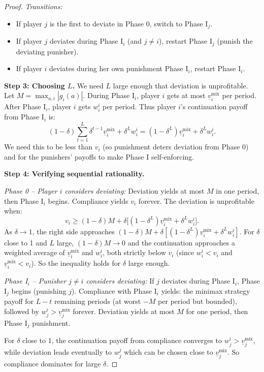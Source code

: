\documentclass[11pt,a4paper]{article}
\theoremstyle{definition}
\theoremstyle{plain}
\theoremstyle{remark}
\begin{document}
\begin{proof}
\emph{Transitions:}
\begin{itemize}
    \item If player $j$ is the first to deviate in Phase 0, switch to Phase I$_j$.
    \item If player $j$ deviates during Phase I$_i$ (and $j \neq i$), restart Phase I$_j$
    (punish the deviating punisher).
    \item If player $i$ deviates during her own punishment Phase I$_i$, restart Phase I$_i$.
\end{itemize}

\textbf{Step 3: Choosing $L$.}
We need $L$ large enough that deviation is unprofitable. Let $M = \max_{a,i} |g_i(a)|$.
During Phase I$_i$, player $i$ gets at most $\underline{v}_i^{\text{mix}}$ per period.
After Phase I$_i$, player $i$ gets $w^i_i$ per period. Thus player $i$'s continuation payoff
from Phase I$_i$ is:
\[
    (1-\delta) \sum_{t=1}^{L} \delta^{t-1} \underline{v}_i^{\text{mix}}
    + \delta^L w^i_i
    = (1 - \delta^L) \underline{v}_i^{\text{mix}} + \delta^L w^i_i.
\]
We need this to be less than $v_i$ (so punishment deters deviation from Phase 0) and for
the punishers' payoffs to make Phase I self-enforcing.

\textbf{Step 4: Verifying sequential rationality.}

\emph{Phase 0 -- Player $i$ considers deviating:}
Deviation yields at most $M$ in one period, then Phase I$_i$ begins. Compliance yields
$v_i$ forever. The deviation is unprofitable when:
\[
    v_i \geq (1-\delta) M + \delta \bigl[(1 - \delta^L)
    \underline{v}_i^{\text{mix}} + \delta^L w^i_i\bigr].
\]
As $\delta \to 1$, the right side approaches $(1-\delta)M + \delta[(1-\delta^L)
\underline{v}_i^{\text{mix}} + \delta^L w^i_i]$. For $\delta$ close to 1 and $L$ large,
$(1-\delta)M \to 0$ and the continuation approaches a weighted average of
$\underline{v}_i^{\text{mix}}$ and $w^i_i$, both strictly below $v_i$ (since $w^i_i < v_i$
and $\underline{v}_i^{\text{mix}} < v_i$). So the inequality holds for $\delta$ large
enough.

\emph{Phase I$_i$ -- Punisher $j \neq i$ considers deviating:}
If $j$ deviates during Phase I$_i$, Phase I$_j$ begins (punishing $j$). Compliance with
Phase I$_i$ yields: the minimax strategy payoff for $L-t$ remaining periods (at worst
$-M$ per period but bounded), followed by $w^i_j > \underline{v}_j^{\text{mix}}$ forever.
Deviation yields at most $M$ for one period, then Phase I$_j$ punishment.

For $\delta$ close to 1, the continuation payoff from compliance converges to $w^i_j >
\underline{v}_j^{\text{mix}}$, while deviation leads eventually to $w^j_j$ which can be
chosen close to $\underline{v}_j^{\text{mix}}$. So compliance dominates for large $\delta$.


\end{proof}
\end{document}
